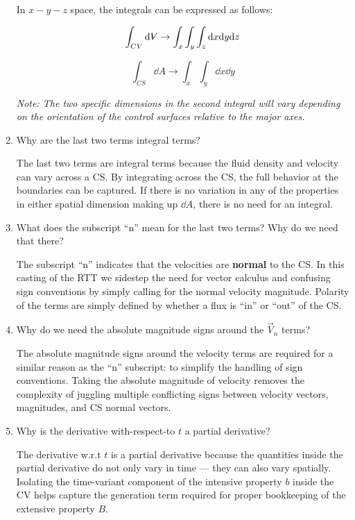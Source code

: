 \documentclass[../main.tex]{subfiles}
\begin{document}
\begin{enumerate}[label = (\alph*)]
    In $x-y-z$ space, the integrals can be expressed as follows:

    \[\int_{CV} \dd \volume \rightarrow \int_x \int_y \int_z \dd x \dd y \dd z\]

    \[\int_{CS} \dd A \rightarrow \int_x \int_y \dd x \dd y\]

    \textit{Note: The two specific dimensions in the second integral will vary depending on the orientation of the control surfaces relative to the major axes.}
        
    \item Why are the last two terms integral terms?

    The last two terms are integral terms because the fluid density and velocity can vary across a CS.
    By integrating across the CS, the full behavior at the boundaries can be captured.
    If there is no variation in any of the properties in either spatial dimension making up $\dd A$, there is no need for an integral. 

    \item What does the subscript ``n'' mean for the last two terms? Why do we need that there?
    
    The subscript ``n'' indicates that the velocities are \textbf{normal} to the CS.
    In this casting of the RTT we sidestep the need for vector calculus and confusing sign conventions by simply calling for the normal velocity magnitude.
    Polarity of the terms are simply defined by whether a flux is ``in'' or ``out'' of the CS.

    \item Why do we need the absolute magnitude signs around the \(\vec{V}_n\) terms?
   
    The absolute magnitude signs around the velocity terms are required for a similar reason as the ``n'' subscript: to simplify the handling of sign conventions.
    Taking the absolute magnitude of velocity removes the complexity of juggling multiple conflicting signs between velocity vectors, magnitudes, and CS normal vectors. 

    \item Why is the derivative with-respect-to \(t\) a partial derivative?
   
    The derivative w.r.t $t$ is a partial derivative because the quantities inside the partial derivative do not only vary in time --- they can also vary spatially.
    Isolating the time-variant component of the intensive property $b$ inside the CV helps capture the generation term required for proper bookkeeping of the extensive property $B$. 


\end{enumerate}
\end{document}
